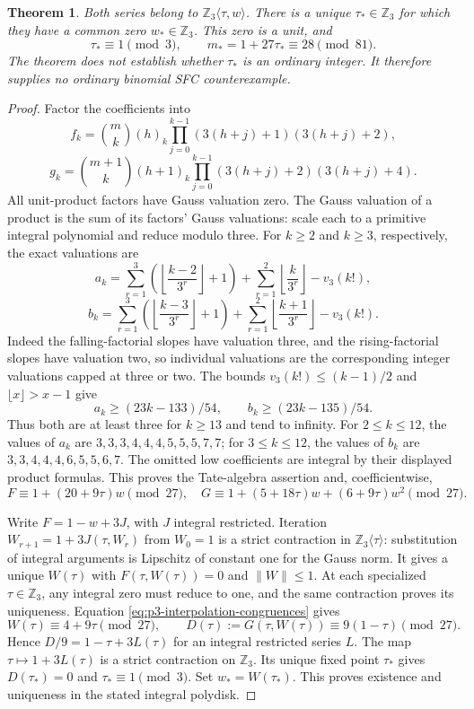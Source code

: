 \documentclass[11pt]{article}
\newtheorem{theorem}{Theorem}
\begin{document}
\begin{theorem}\label{thm:p3-index-interpolation-obstruction}
Both series belong to $\mathbb Z_3\langle\tau,w\rangle$.
There is a unique $\tau_*\in\mathbb Z_3$ for which they have a common
zero $w_*\in\mathbb Z_3$. This zero is a unit, and
\[
 \tau_*\equiv1\pmod3,\qquad m_*=1+27\tau_*\equiv28\pmod{81}.
\]
The theorem does not establish whether $\tau_*$ is an ordinary integer.
It therefore supplies no ordinary binomial SFC counterexample.
\end{theorem}
\begin{proof}
Factor the coefficients into
\[
 f_k=\binom mk(h)_k
  \prod_{j=0}^{k-1}(3(h+j)+1)(3(h+j)+2),
\]
\[
 g_k=\binom{m+1}k(h+1)_k
  \prod_{j=0}^{k-1}(3(h+j)+2)(3(h+j)+4).
\]
All unit-product factors have Gauss valuation zero. The Gauss
valuation of a product is the sum of its factors' Gauss valuations:
scale each to a primitive integral polynomial and reduce modulo three.
For $k\ge2$ and $k\ge3$, respectively, the exact valuations are
\[
 a_k=\sum_{r=1}^3\left(\left\lfloor\frac{k-2}{3^r}\right\rfloor+1\right)
       +\sum_{r=1}^2\left\lfloor\frac{k}{3^r}\right\rfloor-v_3(k!),
\]
\[
 b_k=\sum_{r=1}^3\left(\left\lfloor\frac{k-3}{3^r}\right\rfloor+1\right)
       +\sum_{r=1}^2\left\lfloor\frac{k+1}{3^r}\right\rfloor-v_3(k!).
\]
Indeed the falling-factorial slopes have valuation three, and the
rising-factorial slopes have valuation two, so individual valuations
are the corresponding integer valuations capped at three or two.
The bounds $v_3(k!)\le(k-1)/2$ and $\lfloor x\rfloor>x-1$ give
\[
 a_k\ge(23k-133)/54,\qquad b_k\ge(23k-135)/54.
\]
Thus both are at least three for $k\ge13$ and tend to infinity.
For $2\le k\le12$, the values of $a_k$ are
$3,3,3,4,4,4,5,5,5,7,7$; for $3\le k\le12$, the values of $b_k$
are $3,3,4,4,4,6,5,5,6,7$.
The omitted low coefficients are integral by their displayed product
formulas. This proves the Tate-algebra assertion and, coefficientwise,
\[
 F\equiv1+(20+9\tau)w\pmod{27},
\quad
 G\equiv1+(5+18\tau)w+(6+9\tau)w^2\pmod{27}.                 \tag{I3}\label{eq:p3-interpolation-congruences}
\]

Write $F=1-w+3J$, with $J$ integral restricted.
Iteration $W_{r+1}=1+3J(\tau,W_r)$ from $W_0=1$ is a strict contraction
in $\mathbb Z_3\langle \tau\rangle$: substitution of integral arguments
is Lipschitz of constant one for the Gauss norm.
It gives a unique $W(\tau)$ with $F(\tau,W(\tau))=0$ and $\|W\|\le1$.
At each specialized $\tau\in\mathbb Z_3$, any integral zero must reduce
to one, and the same contraction proves its uniqueness.
Equation \eqref{eq:p3-interpolation-congruences} gives
\[
 W(\tau)\equiv4+9\tau\pmod{27},\qquad
 D(\tau):=G(\tau,W(\tau))\equiv9(1-\tau)\pmod{27}.
\]
Hence $D/9=1-\tau+3L(\tau)$ for an integral restricted series $L$.
The map $\tau\mapsto1+3L(\tau)$ is a strict contraction on $\mathbb Z_3$.
Its unique fixed point $\tau_*$ gives $D(\tau_*)=0$ and $\tau_*\equiv1\pmod3$.
Set $w_*=W(\tau_*)$. This proves existence and uniqueness in the stated
integral polydisk.
\end{proof}
\end{document}
